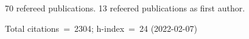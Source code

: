 70 refereed publications. 13 refeered publications as first author.

Total citations~=~2304; h-index~=~24 (2022-02-07)